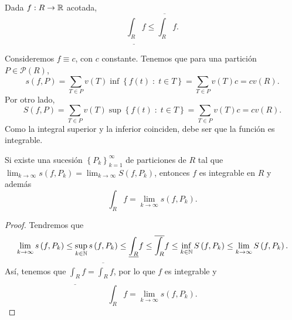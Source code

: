 \begin{colorary}
Dada $\displaystyle f : R \to \mathbb{R} $ acotada,
\[\underline{\int _{R}}f \leq \overline{\int _{R}}f .\]
\end{colorary}

\begin{eg}
Consideremos $\displaystyle f \equiv c $, con $\displaystyle c $ constante. Tenemos que para una partición $\displaystyle P \in \mathcal{P}\left(R\right)$,
\[s\left(f,P\right) = \sum_{T \in P}v\left(T\right) \inf \left\{ f\left(t\right) \; : \; t\in T\right\}  = \sum_{T \in P}v\left(T\right)c = cv\left(R\right).\]
Por otro lado, 
\[ S\left(f,P\right) = \sum_{T \in P}v\left(T\right)\sup \left\{ f\left(t\right) \; : \; t \in T\right\} = \sum_{T \in P}v\left(T\right)c = cv\left(R\right).\]
Como la integral superior y la inferior coinciden, debe ser que la función es integrable.
\end{eg}
\begin{prop}
	Si existe una sucesión $\displaystyle \left\{ P_{k}\right\} ^{\infty}_{k=1} $ de particiones de $\displaystyle R $ tal que $\displaystyle \lim_{k \to \infty}s\left(f,P_{k}\right)=\lim_{k \to \infty}S\left(f,P_{k}\right) $, entonces $\displaystyle f $ es integrable en $\displaystyle R $ y además
	\[\int _{R}f =\lim_{k \to \infty}s\left(f,P_{k}\right) .\]
\end{prop}
\begin{proof}
Tendremos que 
\[\lim_{k \to \infty}s\left(f,P_{k}\right)\leq \sup_{k \in \mathbb{N}}s\left(f,P_{k}\right)\leq \underline{\int _{R} } f \leq \overline{\int _{R}}f \leq \inf_{k \in \mathbb{N}}S\left(f,P_{k}\right)\leq \lim_{k \to \infty}S\left(f,P_{k}\right).\]
Así, tenemos que $\displaystyle \underline{\int _{R}}f = \overline{\int _{R}}f $, por lo que $\displaystyle f $ es integrable y
\[\int _{R}f =\lim_{k \to \infty}s\left(f,P_{k}\right) .\]
\end{proof}

